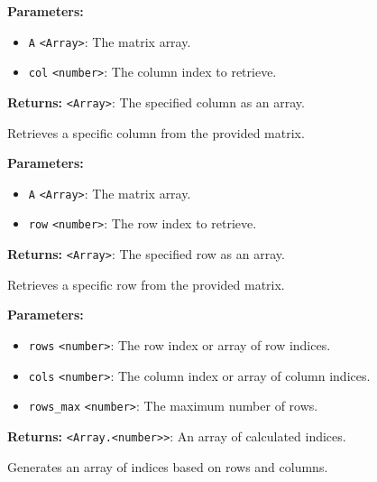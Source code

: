 \documentclass[12pt,a4paper]{article}
\begin{document}
\noindent \textbf{Parameters:}
\begin{itemize}
  \item \texttt{A} \texttt{<Array>}: The matrix array.
  \item \texttt{col} \texttt{<number>}: The column index to retrieve.
\end{itemize}

\noindent \textbf{Returns:} \texttt{<Array>}: The specified column as an array.

\noindent Retrieves a specific column from the provided matrix.

\vspace{5mm}
\noindent {}


\noindent \textbf{Parameters:}
\begin{itemize}
  \item \texttt{A} \texttt{<Array>}: The matrix array.
  \item \texttt{row} \texttt{<number>}: The row index to retrieve.
\end{itemize}

\noindent \textbf{Returns:} \texttt{<Array>}: The specified row as an array.

\noindent Retrieves a specific row from the provided matrix.

\vspace{5mm}
\noindent {}


\noindent \textbf{Parameters:}
\begin{itemize}
  \item \texttt{rows} \texttt{<number>}: The row index or array of row indices.
  \item \texttt{cols} \texttt{<number>}: The column index or array of column indices.
  \item \texttt{rows\_max} \texttt{<number>}: The maximum number of rows.
\end{itemize}

\noindent \textbf{Returns:} \texttt{<Array.<number>>}: An array of calculated indices.

\noindent Generates an array of indices based on rows and columns.

\vspace{5mm}
\noindent {}
\end{document}
